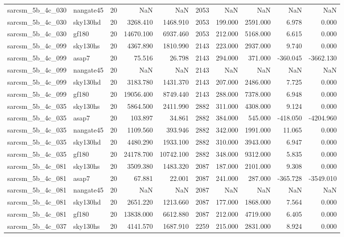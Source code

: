 \begin{longtable}{llrrrrrrrr}
sarcsm\_5b\_4c\_030 & nangate45 & 20 & NaN & NaN & 2053 & NaN & NaN & NaN & NaN \\
sarcsm\_5b\_4c\_030 & sky130hd & 20 & 3268.410 & 1468.910 & 2053 & 199.000 & 2591.000 & 6.978 & 0.000 \\
sarcsm\_5b\_4c\_030 & gf180 & 20 & 14670.100 & 6937.460 & 2053 & 212.000 & 5168.000 & 6.615 & 0.000 \\
sarcsm\_5b\_4c\_099 & sky130hs & 20 & 4367.890 & 1810.990 & 2143 & 223.000 & 2937.000 & 9.740 & 0.000 \\
sarcsm\_5b\_4c\_099 & asap7 & 20 & 75.516 & 26.798 & 2143 & 294.000 & 371.000 & -360.045 & -3662.130 \\
sarcsm\_5b\_4c\_099 & nangate45 & 20 & NaN & NaN & 2143 & NaN & NaN & NaN & NaN \\
sarcsm\_5b\_4c\_099 & sky130hd & 20 & 3183.780 & 1431.370 & 2143 & 207.000 & 2486.000 & 7.725 & 0.000 \\
sarcsm\_5b\_4c\_099 & gf180 & 20 & 19056.400 & 8749.440 & 2143 & 288.000 & 7378.000 & 6.948 & 0.000 \\
sarcsm\_5b\_4c\_035 & sky130hs & 20 & 5864.500 & 2411.990 & 2882 & 311.000 & 4308.000 & 9.124 & 0.000 \\
sarcsm\_5b\_4c\_035 & asap7 & 20 & 103.897 & 34.861 & 2882 & 384.000 & 545.000 & -418.050 & -4204.960 \\
sarcsm\_5b\_4c\_035 & nangate45 & 20 & 1109.560 & 393.946 & 2882 & 342.000 & 1991.000 & 11.065 & 0.000 \\
sarcsm\_5b\_4c\_035 & sky130hd & 20 & 4480.290 & 1933.100 & 2882 & 310.000 & 3943.000 & 6.947 & 0.000 \\
sarcsm\_5b\_4c\_035 & gf180 & 20 & 24178.700 & 10742.100 & 2882 & 348.000 & 9312.000 & 5.835 & 0.000 \\
sarcsm\_5b\_4c\_081 & sky130hs & 20 & 3509.380 & 1483.320 & 2087 & 187.000 & 2101.000 & 9.308 & 0.000 \\
sarcsm\_5b\_4c\_081 & asap7 & 20 & 67.881 & 22.001 & 2087 & 241.000 & 287.000 & -365.728 & -3549.010 \\
sarcsm\_5b\_4c\_081 & nangate45 & 20 & NaN & NaN & 2087 & NaN & NaN & NaN & NaN \\
sarcsm\_5b\_4c\_081 & sky130hd & 20 & 2651.220 & 1213.660 & 2087 & 177.000 & 1868.000 & 7.564 & 0.000 \\
sarcsm\_5b\_4c\_081 & gf180 & 20 & 13838.000 & 6612.880 & 2087 & 212.000 & 4719.000 & 6.405 & 0.000 \\
sarcsm\_5b\_4c\_037 & sky130hs & 20 & 4141.570 & 1687.910 & 2259 & 215.000 & 2831.000 & 8.924 & 0.000 \\

\end{longtable}
